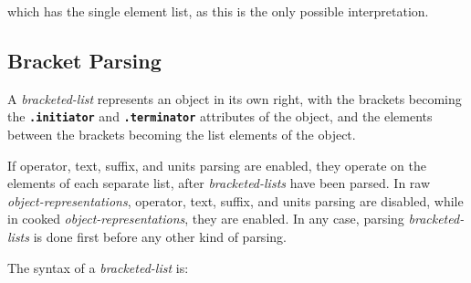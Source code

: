 \documentclass[12pt]{article}
\newcommand{\TT}[1]{{\tt \bfseries #1}}
\begin{document}
which has the single element list, as this is the only possible
interpretation.

\subsection{Bracket Parsing}
\label{BRACKET-PARSING}

A {\em bracketed-list} represents an object in its own right,
with the brackets becoming the \TT{.initia\-tor} and \TT{.termina\-tor}
attributes of the object, and the elements between the brackets
becoming the list elements of the object.

If operator, text, suffix,
and units parsing are enabled, they operate on the elements of each
separate list, after {\em bracketed-lists} have been parsed.
In raw {\em object-representations}, operator, text, suffix, and
units parsing are disabled, while in cooked {\em object-representations},
they are enabled.  In any case, parsing {\em bracketed-lists} is done
first before any other kind of parsing.

The syntax of a {\em bracketed-list} is:
\end{document}
